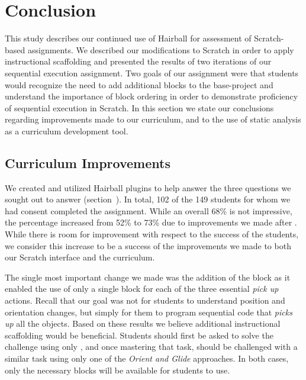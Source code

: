 \section{Conclusion} 
This study describes our continued use of Hairball for assessment of
Scratch-based assignments. We described our modifications to Scratch in order
to apply instructional scaffolding and presented the results of two iterations
of our sequential execution assignment. Two goals of our assignment were that
students would recognize the need to add additional blocks to the base-project
and understand the importance of block ordering in order to demonstrate
proficiency of sequential execution in Scratch. In this section we state our
conclusions regarding improvements made to our curriculum, and to the use of
static analysis as a curriculum development tool.

\subsection{Curriculum Improvements}
We created and utilized Hairball plugins to help answer the three questions we
sought out to answer (section~). In total, 102 of the 149
students for whom we had consent completed the assignment. While an overall
68\% is not impressive, the percentage increased from 52\% to 73\% due to
improvements we made after \sone{}. While there is room for improvement with
respect to the success of the students, we consider this increase to be a
success of the improvements we made to both our Scratch interface and the
curriculum.

The single most important change we made was the addition of the \glideto{}
block as it enabled the use of only a single block for each of the three
essential \emph{pick up} actions. Recall that our goal was not for students to
understand position and orientation changes, but simply for them to program
sequential code that \emph{picks up} all the objects. Based on these results we
believe additional instructional scaffolding would be beneficial. Students
should first be asked to solve the challenge using only \glideto{}, and once
mastering that task, should be challenged with a similar task using only one of
the \emph{Orient and Glide} approaches. In both cases, only the necessary
blocks will be available for students to use.

